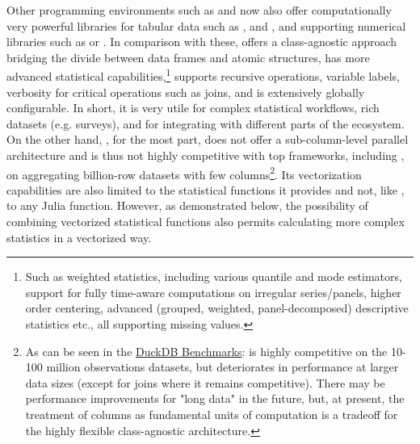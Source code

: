 \documentclass[article]{jss}
\begin{document}
Other programming environments such as  and  now also offer computationally very powerful libraries for tabular data such as  \citep{jldataframes},  \citep{pypolars} and  \citep{mckinney2010pandas, pypandas}, and supporting numerical libraries such as  \citep{pynumpy} or  \citep{jlstatsbase}. %
In comparison with these,  offers a class-agnostic approach bridging the divide between data frames and atomic structures, has more advanced statistical capabilities,\footnote{Such as weighted statistics, including various quantile and mode estimators, support for fully time-aware computations on irregular series/panels, higher order centering, advanced (grouped, weighted, panel-decomposed) descriptive statistics etc., all supporting missing values.} supports recursive operations, variable labels, verbosity for critical operations such as joins, and is extensively globally configurable. In short, it is very utile for complex statistical workflows, rich datasets (e.g. surveys), and for integrating with different parts of the  ecosystem. On the other hand, , for the most part, does not offer a sub-column-level parallel architecture and is thus not highly competitive with top frameworks, including , on aggregating billion-row datasets with few columns\footnote{As can be seen in the \href{https://duckdblabs.github.io/db-benchmark/}{DuckDB Benchmarks}:  is highly competitive on the 10-100 million observations datasets, but deteriorates in performance at larger data sizes (except for joins where it remains competitive). There may be performance improvements for "long data" in the future, but, at present, the treatment of columns as fundamental units of computation is a tradeoff for the highly flexible class-agnostic architecture.}. Its vectorization capabilities are also limited to the statistical functions it provides and not, like , to any Julia function. However, as demonstrated below, the possibility of combining vectorized statistical functions also permits calculating more complex statistics in a vectorized way. \newline
\end{document}

